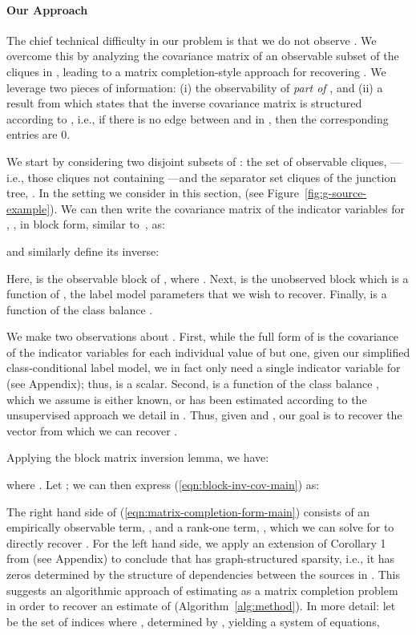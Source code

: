 \documentclass[letterpaper]{article}
\begin{document}
\paragraph*{Our Approach}
The chief technical difficulty in our problem is that we do not observe .
We overcome this by analyzing the covariance matrix of an observable subset of the cliques in , leading to a matrix completion-style approach for recovering .
We leverage two pieces of information: (i) the observability of \textit{part of} , and (ii) a result from \citep{loh2012structure} which states that the inverse covariance matrix  is structured according to , i.e., if there is no edge between  and  in , then the corresponding entries are 0.

We start by considering two disjoint subsets of : the set of observable cliques, ---i.e., those cliques not containing ---and the separator set cliques of the junction tree, . In the setting we consider in this section,  (see Figure~\ref{fig:g-source-example}).
We can then write the covariance matrix of the indicator variables for , , in block form, similar to~\cite{chandrasekaran2010latent}, as:

and similarly define its inverse:

Here,  is the observable block of , where .
Next,  is the unobserved block which is a function of , the label model parameters that we wish to recover.
Finally,  is a function of the class balance .

We make two observations about .
First, while the full form of  is the covariance of the  indicator variables for each individual value of  but one, given our simplified class-conditional label model, we in fact only need a single indicator variable for  (see Appendix\versionswitch{}{ \ref{appendix:rank-one-reduction}}); thus,  is a scalar.
Second,  is a function of the class balance , which we assume is either known, or has been estimated according to the unsupervised approach we detail in .
Thus, given  and  , our goal is to recover the vector  from which we can recover .
	
Applying the block matrix inversion lemma, we have:

where .
Let ; we can then express (\ref{eqn:block-inv-cov-main}) as:

The right hand side of (\ref{eqn:matrix-completion-form-main}) consists of an empirically observable term, , and a rank-one term, , which we can solve for to directly recover .
For the left hand side, we apply an extension of Corollary 1 from \citep{loh2012structure} (see Appendix\versionswitch{}{ \ref{appendix:model-estimation}}) to conclude that  has graph-structured sparsity, i.e., it has zeros determined by the structure of dependencies between the sources in .
This suggests an algorithmic approach of estimating  as a matrix completion problem in order to recover an estimate of  (Algorithm~\ref{alg:method}).
In more detail: let  be the set of indices  where , determined by , yielding a system of equations,
\end{document}
